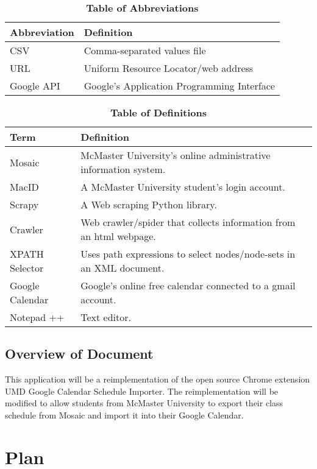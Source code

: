 \documentclass[12pt, titlepage]{article}
\begin{document}
\begin{table}[hbp]
\caption{\textbf{Table of Abbreviations}} \label{Table}

\begin{tabularx}{\textwidth}{p{3cm}X}
\toprule
\textbf{Abbreviation} & \textbf{Definition} \\
\midrule
CSV & Comma-separated values file\\
URL & Uniform Resource Locator/web address\\
Google API & Google’s Application Programming Interface\\
\bottomrule
\end{tabularx}

\end{table}
\begin{table}[!htbp]
\caption{\textbf{Table of Definitions}} \label{Table}
\begin{tabularx}{\textwidth}{p{3cm}X}
\toprule
\textbf{Term} & \textbf{Definition}\\
\midrule
Mosaic & McMaster University's online administrative information system.\\
MacID & A McMaster University student's login account.\\
Scrapy & A Web scraping Python library.\\
Crawler & Web crawler/spider that collects information from an html webpage.\\
XPATH Selector & Uses path expressions to select nodes/node-sets in an XML document. \\
Google Calendar & Google’s online free calendar connected to a gmail account.\\
Notepad ++ & Text editor.\\
\bottomrule
\end{tabularx}

\end{table}	

\newpage
\subsection{Overview of Document}
This application will be a reimplementation of the open source Chrome extension UMD Google Calendar Schedule Importer. The reimplementation will be modified to allow students from McMaster University to export their class schedule from Mosaic and import it into their Google Calendar.
\section{Plan}
	
\end{document}
